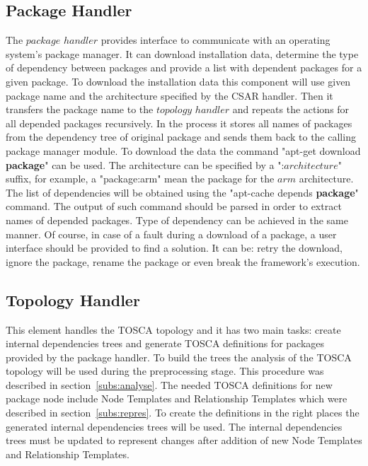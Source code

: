 \subsection{Package Handler} \label{subs:archph}
The $package$ $handler$ provides interface to communicate with an operating system's package manager. 
It can download installation data, determine the type of dependency between packages and provide a list with dependent packages for a given package.
To download the installation data this component will use given package name and the architecture specified by the CSAR handler.
Then it transfers the package name to the $topology$ $handler$ and repeats the actions for all depended packages recursively. 
In the process it stores all names of packages from the dependency tree of original package and sends them back to the calling package manager module.
To download the data the command "apt-get download \textbf{package}" can be used. 
The architecture can be specified by a ":$architecture$" suffix, for example, a "package:arm" mean the package for the $arm$ architecture.
The list of dependencies will be obtained using the "apt-cache depends \textbf{package}" command. 
The output of such command should be parsed in order to extract names of depended packages.
Type of dependency can be achieved in the same manner.
Of course, in case of a fault during a download of a package, a user interface should be provided to find a solution.
It can be: retry the download, ignore the package, rename the package or even break the framework's execution.

\subsection{Topology Handler} \label{subs:archtop}
This element handles the TOSCA topology and it has two main tasks: create internal dependencies trees and generate TOSCA definitions for packages provided by the package handler.
To build the trees the analysis of the TOSCA topology will be used during the preprocessing stage.
This procedure was described in section~\ref{subs:analyse}.
The needed TOSCA definitions for new package node include Node Templates and Relationship Templates which were described in section~\ref{subs:repres}.
To create the definitions in the right places the generated internal dependencies trees will be used.
The internal dependencies trees must be updated to represent changes after addition of new Node Templates and Relationship Templates.
